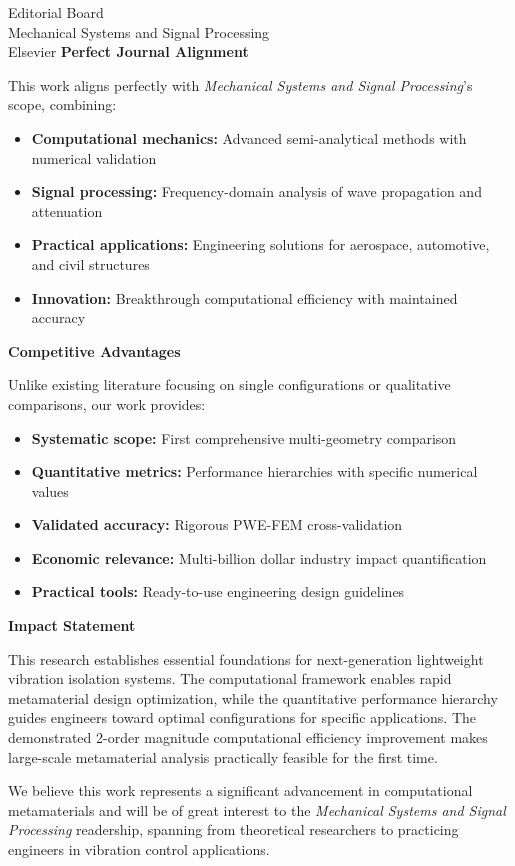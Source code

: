 \documentclass[11pt]{letter}
\begin{document}
\begin{letter}{Editorial Board\\
Mechanical Systems and Signal Processing\\
Elsevier}
\vspace{0.3cm}
\textbf{Perfect Journal Alignment}

This work aligns perfectly with \emph{Mechanical Systems and Signal Processing}'s scope, combining:
\begin{itemize}
\item \textbf{Computational mechanics:} Advanced semi-analytical methods with numerical validation
\item \textbf{Signal processing:} Frequency-domain analysis of wave propagation and attenuation
\item \textbf{Practical applications:} Engineering solutions for aerospace, automotive, and civil structures
\item \textbf{Innovation:} Breakthrough computational efficiency with maintained accuracy
\end{itemize}

\vspace{0.3cm}
\textbf{Competitive Advantages}

Unlike existing literature focusing on single configurations or qualitative comparisons, our work provides:
\begin{itemize}
\item \textbf{Systematic scope:} First comprehensive multi-geometry comparison
\item \textbf{Quantitative metrics:} Performance hierarchies with specific numerical values
\item \textbf{Validated accuracy:} Rigorous PWE-FEM cross-validation
\item \textbf{Economic relevance:} Multi-billion dollar industry impact quantification
\item \textbf{Practical tools:} Ready-to-use engineering design guidelines
\end{itemize}

\vspace{0.3cm}
\textbf{Impact Statement}

This research establishes essential foundations for next-generation lightweight vibration isolation systems. The computational framework enables rapid metamaterial design optimization, while the quantitative performance hierarchy guides engineers toward optimal configurations for specific applications. The demonstrated 2-order magnitude computational efficiency improvement makes large-scale metamaterial analysis practically feasible for the first time.

We believe this work represents a significant advancement in computational metamaterials and will be of great interest to the \emph{Mechanical Systems and Signal Processing} readership, spanning from theoretical researchers to practicing engineers in vibration control applications.


\end{letter}
\end{document}
